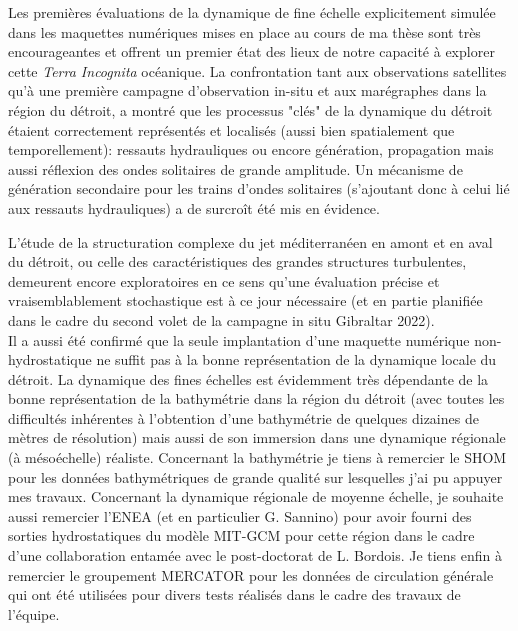 Les premières évaluations de la dynamique de fine échelle explicitement simulée dans les maquettes numériques mises en place au cours de ma thèse sont très encourageantes et offrent un premier état des lieux de notre capacité à explorer cette \textit{Terra Incognita} océanique. La confrontation tant aux observations satellites qu'à une première campagne d'observation in-situ et aux marégraphes dans la région du détroit, a montré que les processus "clés" de la dynamique du détroit étaient correctement représentés et localisés (aussi bien spatialement que temporellement): ressauts hydrauliques ou encore génération, propagation mais aussi réflexion des ondes solitaires de grande amplitude. Un mécanisme de génération secondaire pour les trains d'ondes solitaires (s'ajoutant donc à celui lié aux ressauts hydrauliques) a de surcroît été mis en évidence.

L'étude de la structuration complexe du jet méditerranéen en amont et en aval du détroit, ou celle des caractéristiques des grandes structures turbulentes, demeurent encore exploratoires en ce sens qu'une évaluation précise et vraisemblablement stochastique est à ce jour nécessaire (et en partie planifiée dans le cadre du second volet de la campagne in situ Gibraltar 2022).\\

Il a aussi été confirmé que la seule implantation d'une maquette numérique non-hydrosta\-tique ne suffit pas à la bonne représentation de la dynamique locale du détroit. La dynamique des fines échelles est évidemment très dépendante de la bonne représentation de la bathymétrie dans la région du détroit (avec toutes les difficultés inhérentes à l'obtention d'une bathymétrie de quelques dizaines de mètres de résolution) mais aussi de son immersion dans une dynamique régionale (à mésoéchelle) réaliste. Concernant la bathymétrie je tiens à remercier le SHOM pour les données bathymétriques de grande qualité sur lesquelles j'ai pu appuyer mes travaux. Concernant la dynamique régionale de moyenne échelle, je souhaite aussi remercier l'ENEA (et en particulier G. Sannino) pour avoir fourni des sorties hydrostatiques du modèle MIT-GCM pour cette région dans le cadre d'une collaboration entamée avec le post-doctorat de L. Bordois. Je tiens enfin à remercier le groupement MERCATOR pour les données de circulation générale qui ont été utilisées pour divers tests réalisés dans le cadre des travaux de l'équipe.

